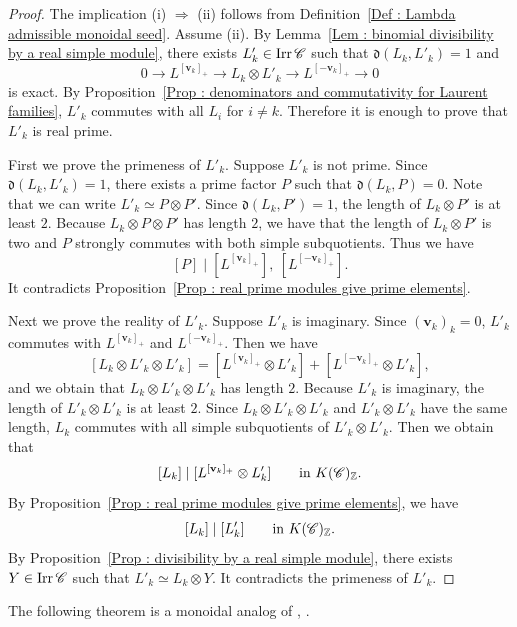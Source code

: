 \begin{proof}
The implication (i) $\Rightarrow$ (ii) follows from
Definition~\ref{Def : Lambda admissible monoidal seed}.
Assume (ii).
By Lemma~\ref{Lem : binomial divisibility by a real simple module},
there exists $L'_k \in \mathop{\mathrm{Irr}}\nolimits\mathscr{C}$ such that
$\mathfrak{d}(L_k, L'_k) = 1$ and
\[
0 \longrightarrow L^{[\mathbf{v}_k]_+}
\longrightarrow L_k \otimes L'_k
\longrightarrow L^{[-\mathbf{v}_k]_+}
\longrightarrow 0
\]
is exact.
By Proposition~\ref{Prop : denominators and commutativity for Laurent families},
$L'_k$ commutes with all $L_i$ for $i \neq k$.
Therefore it is enough to prove that $L'_k$ is real prime.

First we prove the primeness of $L'_k$.
Suppose $L'_k$ is not prime.
Since $\mathfrak{d}(L_k, L'_k) = 1$,
there exists a prime factor $P$ such that $\mathfrak{d}(L_k, P) = 0$.
Note that we can write $L'_k \simeq P \otimes P'$.
Since $\mathfrak{d}(L_k, P') = 1$,
the length of $L_k \otimes P'$ is at least $2$.
Because $L_k \otimes P \otimes P'$ has length $2$,
we have that the length of $L_k \otimes P'$ is two and
$P$ strongly commutes with both simple subquotients.
Thus we have
\[
[P] \mid [L^{[\mathbf{v}_k]_+}],\ [L^{[-\mathbf{v}_k]_+}].
\]
It contradicts Proposition~\ref{Prop : real prime modules give prime elements}.

Next we prove the reality of $L'_k$.
Suppose $L'_k$ is imaginary.
Since $(\mathbf{v}_k)_k = 0$,
$L'_k$ commutes with $L^{[\mathbf{v}_k]_+}$ and
$L^{[-\mathbf{v}_k]_+}$.
Then we have
\[
[L_k \otimes L'_k \otimes L'_k]
= [L^{[\mathbf{v}_k]_+} \otimes L'_k]
+ [L^{[-\mathbf{v}_k]_+} \otimes L'_k],
\]
and we obtain that $L_k \otimes L'_k \otimes L'_k$ has length $2$.
Because $L'_k$ is imaginary,
the length of $L'_k \otimes L'_k$ is at least $2$.
Since $L_k \otimes L'_k \otimes L'_k$ and $L'_k \otimes L'_k$
have the same length,
$L_k$ commutes with all simple subquotients of $L'_k \otimes L'_k$.
Then we obtain that
\[
[L_k] \mid [L^{[\mathbf{v}_k]_+} \otimes L'_k]
\qquad\text{in $K(\mathscr{C})_{\mathbb{Z}}$}.
\]
By Proposition~\ref{Prop : real prime modules give prime elements}, we have
\[
[L_k] \mid [L'_k]
\qquad\text{in $K(\mathscr{C})_{\mathbb{Z}}$}.
\]
By Proposition~\ref{Prop : divisibility by a real simple module},
there exists $Y \in \mathop{\mathrm{Irr}}\nolimits\mathscr{C}$ such that
$L'_k \simeq L_k \otimes Y$.
It contradicts the primeness of $L'_k$.
\end{proof}

The following theorem is a monoidal analog of
\cite[Theorem 5.1]{BMRRT}, \cite[Theorem 5.3]{IY08}.

